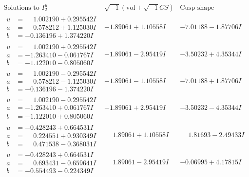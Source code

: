\documentclass[1p]{elsarticle_modified}
\theoremstyle{definition}
\newcommand{\I}{\sqrt{-1}}
\begin{document}
$$\begin{array}{c|c|c}  
\text{Solutions to }I^u_{2}& \I (\text{vol} + \sqrt{-1}CS) & \text{Cusp shape}\\
 \hline 
\begin{aligned}
u &= \phantom{-}1.002190 + 0.295542 I \\
a &= \phantom{-}0.578212 + 1.125030 I \\
b &= -0.136196 + 1.374220 I\end{aligned}
 & -1.89061 + 1.10558 I & -7.01188 - 1.87706 I \\ \hline\begin{aligned}
u &= \phantom{-}1.002190 + 0.295542 I \\
a &= -1.263410 - 0.061767 I \\
b &= -1.122010 - 0.805060 I\end{aligned}
 & -1.89061 - 2.95419 I & -3.50232 + 4.35344 I \\ \hline\begin{aligned}
u &= \phantom{-}1.002190 - 0.295542 I \\
a &= \phantom{-}0.578212 - 1.125030 I \\
b &= -0.136196 - 1.374220 I\end{aligned}
 & -1.89061 - 1.10558 I & -7.01188 + 1.87706 I \\ \hline\begin{aligned}
u &= \phantom{-}1.002190 - 0.295542 I \\
a &= -1.263410 + 0.061767 I \\
b &= -1.122010 + 0.805060 I\end{aligned}
 & -1.89061 + 2.95419 I & -3.50232 - 4.35344 I \\ \hline\begin{aligned}
u &= -0.428243 + 0.664531 I \\
a &= \phantom{-}0.224551 + 0.930349 I \\
b &= \phantom{-}0.471538 - 0.368031 I\end{aligned}
 & \phantom{-}1.89061 + 1.10558 I & \phantom{-}1.81693 - 2.49433 I \\ \hline\begin{aligned}
u &= -0.428243 + 0.664531 I \\
a &= \phantom{-}0.693431 - 0.659641 I \\
b &= -0.554493 - 0.224349 I\end{aligned}
 & \phantom{-}1.89061 - 2.95419 I & -0.06995 + 4.17815 I \\ \hline\begin{aligned}

\end{aligned}
\end{array}$$
\end{document}
